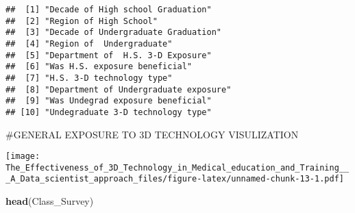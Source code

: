 \documentclass[]{article}
\newenvironment{Shaded}{\begin{snugshade}}{\end{snugshade}}
\newcommand{\DataTypeTok}[1]{\textcolor[rgb]{0.13,0.29,0.53}{#1}}
\newcommand{\KeywordTok}[1]{\textcolor[rgb]{0.13,0.29,0.53}{\textbf{#1}}}
\newcommand{\NormalTok}[1]{#1}
\newcommand{\OperatorTok}[1]{\textcolor[rgb]{0.81,0.36,0.00}{\textbf{#1}}}
\newcommand{\StringTok}[1]{\textcolor[rgb]{0.31,0.60,0.02}{#1}}
\begin{document}
\begin{verbatim}
##  [1] "Decade of High school Graduation"    
##  [2] "Region of High School"               
##  [3] "Decade of Undergraduate Graduation"  
##  [4] "Region of  Undergraduate"            
##  [5] "Department of  H.S. 3-D Exposure"    
##  [6] "Was H.S. exposure beneficial"        
##  [7] "H.S. 3-D technology type"            
##  [8] "Department of Undergraduate exposure"
##  [9] "Was Undegrad exposure beneficial"    
## [10] "Undegraduate 3-D technology type"
\end{verbatim}

\#GENERAL EXPOSURE TO 3D TECHNOLOGY VISULIZATION

\begin{Shaded}
\end{Shaded}

\texttt{[image: The\_Effectiveness\_of\_3D\_Technology\_in\_Medical\_education\_and\_Training\_\_\_A\_Data\_scientist\_approach\_files/figure-latex/unnamed-chunk-13-1.pdf]}

\begin{Shaded}
\begin{Highlighting}[]
\KeywordTok{head}\NormalTok{(Class_Survey)}
\end{Highlighting}
\end{Shaded}
\end{document}
